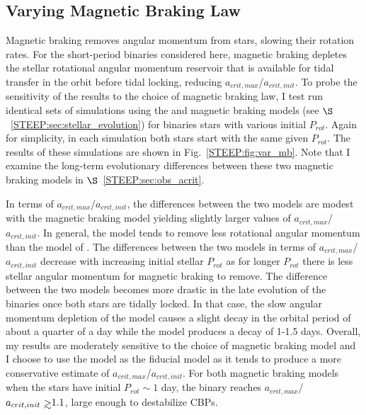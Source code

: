 \subsection{Varying Magnetic Braking Law} \label{STEEP:sec:var_mb}

Magnetic braking removes angular momentum from stars, slowing their rotation rates.  For the short-period binaries considered here, magnetic braking depletes the stellar rotational angular momentum reservoir that is available for tidal transfer in the orbit before tidal locking, reducing $a_{crit,max}$/$a_{crit,init}$.  To probe the sensitivity of the results to the choice of magnetic braking law, I test run identical sets of simulations using the \citet{Reiners2012} and \citet{Repetto2014} magnetic braking models (see $\S$~\ref{STEEP:sec:stellar_evolution}) for binaries stars with various initial $P_{rot}$.  Again for simplicity, in each simulation both stars start with the same given $P_{rot}$.  The results of these simulations are shown in Fig.~\ref{STEEP:fig:var_mb}.  Note that I examine the long-term evolutionary differences between these two magnetic braking models in $\S$~\ref{STEEP:sec:obs_acrit}.

In terms of $a_{crit,max}$/$a_{crit,init}$, the differences between the two models are modest with the \citet{Repetto2014} magnetic braking model yielding slightly larger values of $a_{crit,max}$/$a_{crit,init}$.  In general, the \citet{Repetto2014} model tends to remove less rotational angular momentum than the model of \citet{Reiners2012}.  The differences between the two models in terms of $a_{crit,max}$/$a_{crit,init}$ decrease with increasing initial stellar $P_{rot}$ as for longer $P_{rot}$ there is less stellar angular momentum for magnetic braking to remove.  The difference between the two models becomes more drastic in the late evolution of the binaries once both stars are tidally locked.  In that case, the slow angular momentum depletion of the \citet{Repetto2014} model causes a slight decay in the orbital period of about a quarter of a day while the \citet{Reiners2012} model produces a decay of 1-1.5 days.  Overall, my results are moderately sensitive to the choice of magnetic braking model and I choose to use the \citet{Reiners2012} model as the fiducial model as it tends to produce a more conservative estimate of $a_{crit,max}$/$a_{crit,init}$.  For both magnetic braking models when the stars have initial $P_{rot} \sim 1$ day, the binary reaches $a_{crit,max}$/$a_{crit,init} \gsim 1.1$, large enough to destabilize CBPs.  

